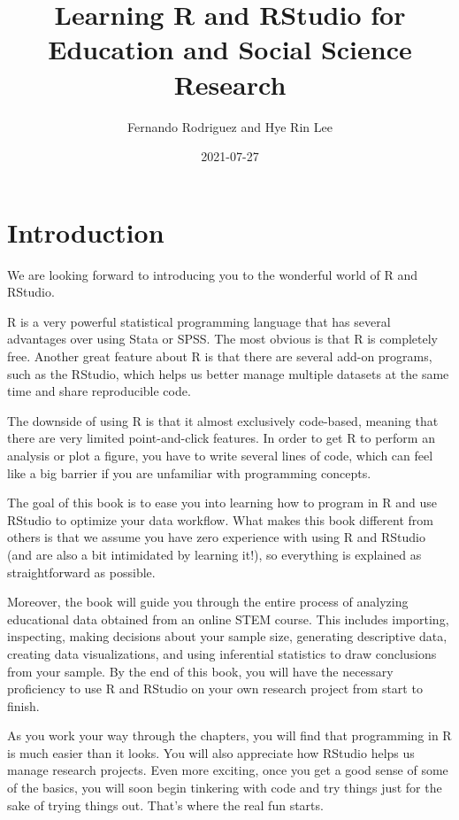 \documentclass[
]{book}
\title{Learning R and RStudio for Education and Social Science Research}
\author{Fernando Rodriguez and Hye Rin Lee}
\date{2021-07-27}
\begin{document}
\maketitle

{
\setcounter{tocdepth}{1}
\tableofcontents
}
\hypertarget{introduction}{%
\chapter{Introduction}\label{introduction}}

We are looking forward to introducing you to the wonderful world of R and RStudio.

R is a very powerful statistical programming language that has several advantages over using Stata or SPSS. The most obvious is that R is completely free. Another great feature about R is that there are several add-on programs, such as the RStudio, which helps us better manage multiple datasets at the same time and share reproducible code.

The downside of using R is that it almost exclusively code-based, meaning that there are very limited point-and-click features. In order to get R to perform an analysis or plot a figure, you have to write several lines of code, which can feel like a big barrier if you are unfamiliar with programming concepts.

The goal of this book is to ease you into learning how to program in R and use RStudio to optimize your data workflow. What makes this book different from others is that we assume you have zero experience with using R and RStudio (and are also a bit intimidated by learning it!), so everything is explained as straightforward as possible.

Moreover, the book will guide you through the entire process of analyzing educational data obtained from an online STEM course. This includes importing, inspecting, making decisions about your sample size, generating descriptive data, creating data visualizations, and using inferential statistics to draw conclusions from your sample. By the end of this book, you will have the necessary proficiency to use R and RStudio on your own research project from start to finish.

As you work your way through the chapters, you will find that programming in R is much easier than it looks. You will also appreciate how RStudio helps us manage research projects. Even more exciting, once you get a good sense of some of the basics, you will soon begin tinkering with code and try things just for the sake of trying things out. That's where the real fun starts.
\end{document}
